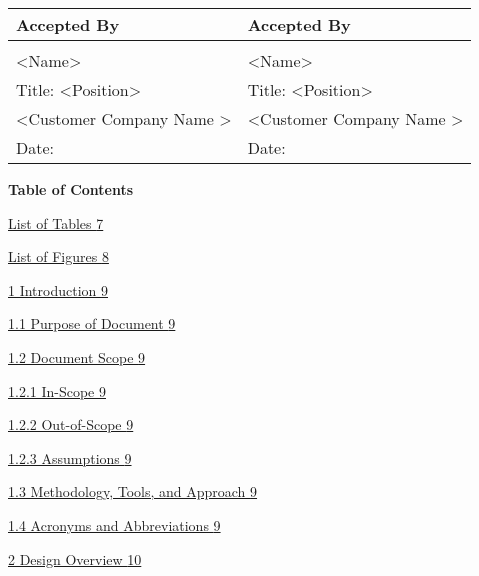 \begin{longtable}[]{@{}
  >{\raggedright\arraybackslash}p{}
  >{\raggedright\arraybackslash}p{}@{}}
\toprule\noalign{}
\begin{minipage}[b]{\linewidth}\raggedright
\textbf{Accepted By}
\end{minipage} & \begin{minipage}[b]{\linewidth}\raggedright
\textbf{Accepted By}
\end{minipage} \\
\midrule\noalign{}
\endhead
\bottomrule\noalign{}
\endlastfoot
& \\
\textless Name\textgreater{} & \textless Name\textgreater{} \\
Title: \textless Position\textgreater{} & Title:
\textless Position\textgreater{} \\
\textless Customer Company Name \textgreater{} & \textless Customer
Company Name \textgreater{} \\
Date: & Date: \\
\end{longtable}

\textbf{Table of Contents}

\hyperref[list-of-tables]{List of Tables \hyperref[list-of-tables]{7}}

\hyperref[list-of-figures]{List of Figures
\hyperref[list-of-figures]{8}}

\hyperref[introduction]{1 Introduction \hyperref[introduction]{9}}

\hyperref[purpose-of-document]{1.1 Purpose of Document
\hyperref[purpose-of-document]{9}}

\hyperref[document-scope]{1.2 Document Scope
\hyperref[document-scope]{9}}

\hyperref[in-scope]{1.2.1 In-Scope \hyperref[in-scope]{9}}

\hyperref[out-of-scope]{1.2.2 Out-of-Scope \hyperref[out-of-scope]{9}}

\hyperref[assumptions]{1.2.3 Assumptions \hyperref[assumptions]{9}}

\hyperref[methodology-tools-and-approach-1]{1.3 Methodology, Tools, and
Approach \hyperref[methodology-tools-and-approach-1]{9}}

\hyperref[acronyms-and-abbreviations-1]{1.4 Acronyms and Abbreviations
\hyperref[acronyms-and-abbreviations-1]{9}}

\hyperref[design-overview]{2 Design Overview
\hyperref[design-overview]{10}}

